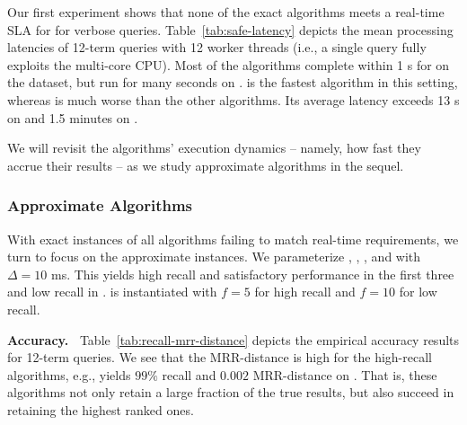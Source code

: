 Our first experiment shows that none of the exact algorithms meets a real-time SLA for for verbose queries. 
Table~\ref{tab:safe-latency} depicts the mean processing latencies of 12-term queries with 12 worker 
threads (i.e., a single query fully exploits the multi-core CPU). Most of the algorithms complete within 
1 s for on the {\cw} dataset, but run for many seconds on \cwten. 
{\pRA} is the fastest algorithm in this setting, whereas
\pNRA\/ is much worse than the other algorithms. Its average latency exceeds 
13 s on \cw\/ and 1.5 minutes on \cwten.

We will revisit the algorithms' execution dynamics -- namely, how fast they accrue their results -- 
as we study approximate algorithms in the sequel. 
 
\subsubsection{Approximate Algorithms}
 
With  exact instances of all  algorithms failing to match  real-time requirements, we turn to focus on the approximate instances. 
We parameterize \alg, \pRA, \pNRA, and \sNRA\/ with $\Delta=10$ ms. 
This yields high recall and satisfactory performance in the first three and low recall in \sNRA. 
\pBMW\/ is instantiated with $f=5$ for high recall and $f=10$ for low recall.  

{\bf Accuracy.\ } Table~\ref{tab:recall-mrr-distance} depicts the empirical accuracy results for 12-term queries. We see that the MRR-distance is high for the high-recall algorithms, 
e.g., \alg\hi\/ yields $99\%$ recall and $0.002$ MRR-distance on \cwten. That is, these 
algorithms not only  retain a large fraction of the true results, but also succeed in retaining the highest ranked ones. 

  
